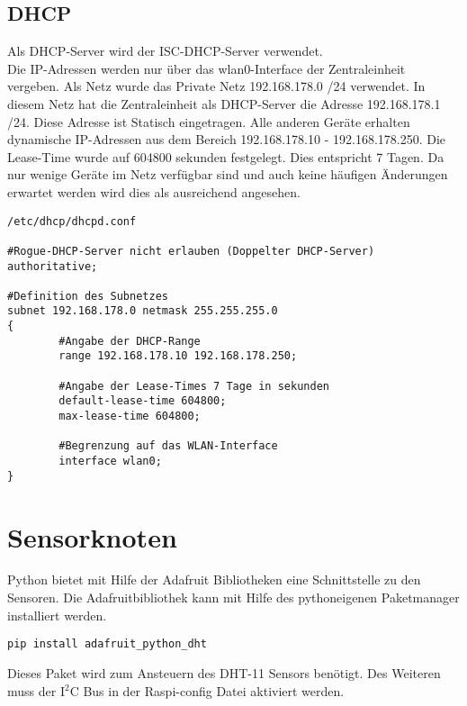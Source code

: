 \subsection{DHCP}
Als DHCP-Server wird der ISC-DHCP-Server verwendet.\\
Die IP-Adressen werden nur über das wlan0-Interface der Zentraleinheit vergeben.
Als Netz wurde das Private Netz 192.168.178.0 /24 verwendet. In diesem Netz hat
die Zentraleinheit als DHCP-Server die Adresse 192.168.178.1 /24. Diese Adresse
ist Statisch eingetragen. Alle anderen Geräte erhalten dynamische IP-Adressen
aus dem Bereich 192.168.178.10 - 192.168.178.250. Die Lease-Time wurde auf
604800 sekunden festgelegt. Dies entspricht 7 Tagen. Da nur wenige Geräte im
Netz verfügbar sind und auch keine häufigen Änderungen erwartet werden wird dies
als ausreichend angesehen.
\begin{verbatim}
/etc/dhcp/dhcpd.conf

#Rogue-DHCP-Server nicht erlauben (Doppelter DHCP-Server)
authoritative;

#Definition des Subnetzes
subnet 192.168.178.0 netmask 255.255.255.0
{
        #Angabe der DHCP-Range
        range 192.168.178.10 192.168.178.250;

        #Angabe der Lease-Times 7 Tage in sekunden
        default-lease-time 604800;
        max-lease-time 604800;

        #Begrenzung auf das WLAN-Interface
        interface wlan0;
}

\end{verbatim}

\section{Sensorknoten} %
Python bietet mit Hilfe der Adafruit\cite{Adafruit60:online} Bibliotheken eine Schnittstelle zu den Sensoren. Die Adafruitbibliothek kann mit Hilfe des pythoneigenen Paketmanager installiert werden.
\begin{verbatim}
pip install adafruit_python_dht
\end{verbatim}
Dieses Paket wird zum Ansteuern des DHT-11 Sensors benötigt. Des Weiteren muss der I$^2$C Bus in der Raspi-config Datei aktiviert werden.
